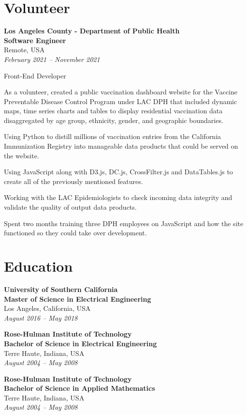 \documentclass{article}
\newcommand{\educationInfo}[4]{
    \item
        \textbf{\large{#1}} \\
        \textbf{#2} \\
        #3 \\
        \textit{#4}
}
\newcommand{\experienceInfo}[4]{
    \item
        \textbf{\large{#1}} \\
        \textbf{#2} \\
        #3 \\
        \textit{#4}
}
\newcommand{\experienceRole}[1]{
    \item #1
}
\newcommand{\experienceTask}[1]{
    \item #1
}
\begin{document}
\section{Volunteer}

\begin{experience}

    \experienceInfo
        {Los Angeles County - Department of Public Health}
        {Software Engineer}
        {Remote, USA}
        {February 2021 -- November 2021}

    \begin{experience}
        \experienceRole{Front-End Developer}
        \begin{experience}
            \experienceTask{As a volunteer, created a public vaccination dashboard website for the Vaccine Preventable Disease Control Program under LAC DPH that included dynamic maps, time series charts and tables to display residential vaccination data disaggregated by age group, ethnicity, gender, and geographic boundaries.}
            \experienceTask{Using Python to distill millions of vaccination entries from the California Immunization Registry into manageable data products that could be served on the website.}
            \experienceTask{Using JavaScript along with D3.js, DC.js, CrossFilter.js and DataTables.js to create all of the previously mentioned features.}
            \experienceTask{Working with the LAC Epidemiologists to check incoming data integrity and validate the quality of output data products.}
            \experienceTask{Spent two months training three DPH employees on JavaScript and how the site functioned so they could take over development.}
        \end{experience}
    \end{experience}
\end{experience}


\section{Education}
\begin{education}
    \educationInfo
        {University of Southern California}
        {Master of Science in Electrical Engineering}
        {Los Angeles, California, USA}
        {August 2016 -- May 2018}
    \educationInfo
        {Rose-Hulman Institute of Technology}
        {Bachelor of Science in Electrical Engineering}
        {Terre Haute, Indiana, USA}
        {August 2004 -- May 2008}
    \educationInfo
        {Rose-Hulman Institute of Technology}
        {Bachelor of Science in Applied Mathematics}
        {Terre Haute, Indiana, USA}
        {August 2004 -- May 2008}
\end{education}
\end{document}

